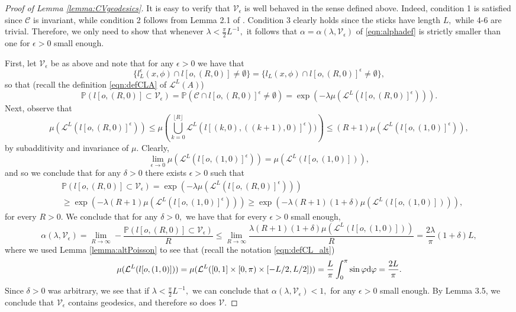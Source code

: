 \documentclass[a4paper,12pt]{article}
\newcommand{\BP}{{\mathbb{P}}}
\newcommand{\CC}{{\mathcal{C}}}
\newcommand{\CL}{{\mathcal{L}}}
\newcommand{\CV}{{\mathcal{V}}}
\newcommand{\dd}{{\rm d}}
\begin{document}
\begin{proof}[Proof of Lemma \ref{lemma:CVgeodesics}]
It is easy to verify that $\CV_\epsilon$ is well behaved in the sense defined above. 
Indeed, condition 1 is satisfied since 
$\CC$ is invariant, while condition 2 follows from Lemma 2.1 of \cite{J_84}. Condition 3 
clearly holds since the sticks have length $L,$ while 4-6 are trivial. Therefore, we only 
need to show that whenever $\lambda<\frac{\pi}{2}L^{-1},$ it follows that 
$\alpha=\alpha(\lambda,\CV_\epsilon)$ of \eqref{eqn:alphadef} is strictly smaller 
than one for $\epsilon>0$ small enough.

First, let $\CV_\epsilon$ be as above and note that for any $\epsilon>0$ 
we have that 
\[
\{l_L^\epsilon(x,\phi)\cap l[o,(R,0)]\neq \emptyset\}
=\{l_L(x,\phi)\cap l[o,(R,0)]^\epsilon\neq \emptyset\},
\]
so that (recall the definition \eqref{eqn:defCLA} of $\CL^L(A)$) 
\[
\BP(l[o,(R,0)]\subset \CV_\epsilon)=\BP(\CC \cap l[o,(R,0)]^\epsilon\neq \emptyset)
=\exp(-\lambda \mu(\CL^L(l[o,(R,0)]^\epsilon))).
\]
Next, observe that
\[
\mu(\CL^L(l[o,(R,0)]^\epsilon))
\leq \mu\left(\bigcup_{k=0}^{\lfloor R \rfloor} \CL^L(l[(k,0),((k+1),0)]^\epsilon))\right)
\leq (R+1)\mu(\CL^L(l[o,(1,0)]^\epsilon)),
\]
by subadditivity and invariance of $\mu.$ 
Clearly,
\[
\lim_{\epsilon \to 0} \mu(\CL^L(l[o,(1,0)]^\epsilon))=\mu(\CL^L(l[o,(1,0)])),
\]
and so we conclude that for any $\delta>0$ there exists $\epsilon>0$ such that 
\begin{align*}
& \BP(l[o,(R,0)]\subset \CV_\epsilon) =\exp(-\lambda \mu(\CL^L(l[o,(R,0)]^\epsilon))) \\
& \geq \exp(-\lambda (R+1)\mu(\CL^L(l[o,(1,0)]^\epsilon)))  
\geq \exp(-\lambda (R+1)(1+\delta)\mu(\CL^L(l[o,(1,0)]))),      
\end{align*}
for every $R>0.$ We conclude that for any $\delta>0,$ we have that for every 
$\epsilon>0$ small enough, 
\[
\alpha(\lambda,\CV_\epsilon)
=\lim_{R \to \infty} - \frac{\BP(l[o,(R,0)]\subset \CV_\epsilon)}{R}
 \leq  \lim_{R \to \infty}  \frac{\lambda (R+1)(1+\delta)\mu(\CL^L(l[o,(1,0)]))}{R}
=  \frac{2\lambda}{\pi}(1+\delta) L,
\]
where we used Lemma \ref{lemma:altPoisson} to see that (recall the notation \eqref{eqn:defCL_alt})
\[
\mu(\CL^L(l[o,(1,0)]))
=\mu(\CL^L([0,1]\times [0,\pi)\times [-L/2,L/2] ))
=\frac{L}{\pi}\int_0^\pi \sin \varphi \dd \varphi=\frac{2L}{\pi}.
\]
Since $\delta>0$ was arbitrary, we see that if 
$\lambda<\frac{\pi}{2}L^{-1},$ we can conclude that $\alpha(\lambda,\CV_\epsilon)<1,$ 
for any $\epsilon>0$ small enough.
By \cite{BJST_09} Lemma 3.5, we conclude that $\CV_\epsilon$ contains geodesics, and 
therefore so does $\CV.$
\end{proof}
\end{document}
